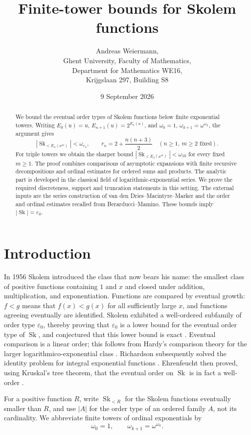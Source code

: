 \documentclass[11pt]{article}
\title{Finite-tower bounds for Skolem functions}
\author{Andreas Weiermann,\\
Ghent University, Faculty of Mathematics,\\ Department for Mathematics WE16,\\ Krijgslaan 297, Building S8}
\date{9 September 2026}
\theoremstyle{definition}
\theoremstyle{remark}
\newcommand{\Sk}{\operatorname{Sk}}
\numberwithin{equation}{section}
\begin{document}
\maketitle
\begin{abstract}
We bound the eventual order types of Skolem functions below finite
exponential towers.
Writing $E_0(u)=u$, $E_{n+1}(u)=2^{E_n(u)}$, and
$\omega_0=1$, $\omega_{k+1}=\omega^{\omega_k}$, the argument gives
\[
 |\Sk_{<E_n(x^m)}|<\omega_{r_n},\qquad
 r_n=2+\frac{n(n+3)}2\quad(n\ge1,\ m\ge2\text{ fixed}).
\]
For triple towers we obtain the sharper bound
$|\Sk_{<E_3(x^m)}|<\omega_{10}$ for every fixed $m\ge1$.
The proof combines comparisons of asymptotic expansions with finite
recursive decompositions and ordinal estimates for ordered sums and
products. The analytic part is developed in the classical field of
logarithmic-exponential series. We prove the required discreteness,
support and truncation statements in this setting. The external
inputs are the series construction of van den Dries--Macintyre--Marker
and the order and ordinal estimates recalled from Berarducci--Mamino.
These bounds imply $|\Sk|=\varepsilon_0$.
\end{abstract}
\noindent
\tableofcontents

\section{Introduction}

In 1956 Skolem introduced the class that now bears his name: the
smallest class of positive functions containing $1$ and $x$ and closed
under addition, multiplication, and exponentiation.  Functions are
compared by eventual growth: $f<g$ means that $f(x)<g(x)$ for all
sufficiently large $x$, and functions agreeing eventually are
identified.  Skolem exhibited a
well-ordered subfamily of order type $\varepsilon_0$, thereby proving
that $\varepsilon_0$ is a lower bound for the eventual order type of
$\Sk$, and conjectured that this lower bound is exact
\cite{Skolem1956}.  Eventual comparison is a linear order; this follows
from Hardy's comparison theory for the larger logarithmico-exponential
class \cite{Hardy1910}.  Richardson subsequently solved the identity
problem for integral exponential functions \cite{Richardson1969}.
Ehrenfeucht then proved,
using Kruskal's tree theorem, that the eventual order on $\Sk$ is in
fact a well-order \cite{Ehrenfeucht1973}.

For a positive function $R$, write $\Sk_{<R}$ for the Skolem functions
eventually smaller than $R$, and use $|A|$ for the order type of an
ordered family $A$, not its cardinality.  We abbreviate finite towers
of ordinal exponentials by
\[
 \omega_0=1,\qquad \omega_{k+1}=\omega^{\omega_k}.
\]
\end{document}
